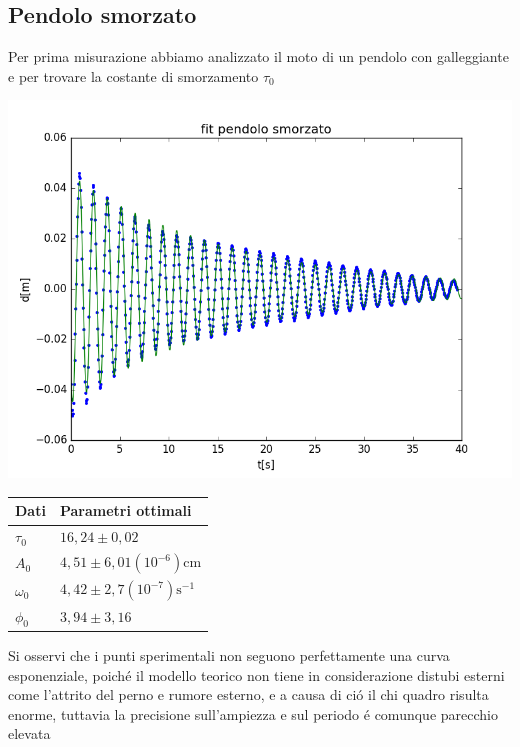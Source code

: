 \documentclass{exam}
\begin{document}
		\subsection{Pendolo smorzato}
			Per prima misurazione abbiamo analizzato il moto di un pendolo con galleggiante	e per trovare la costante di smorzamento $\tau_{0}$ \\
			\begin{minipage}{0.5\textwidth}
				\includegraphics[width=\textwidth]{fit_smorzato}
				\end{minipage}
			\begin{minipage}{0.5\textwidth}
				\begin{tabular}{ll}
					\toprule
					Dati & Parametri ottimali \\
					\midrule
					$\tau_{0}$ & $16,24 \pm 0,02$ \\
					$A_{0}$ & $4,51 \pm 6,01(10^{-6})$cm\\
					$\omega_{0}$ & $4,42 \pm 2,7(10^{-7})\textrm{s}^{-1}$\\			
					$\phi_{0}$ & $3,94 \pm 3,16$\\
					\bottomrule

				\end{tabular}
			\end{minipage}
			Si osservi che i punti sperimentali non seguono perfettamente una curva esponenziale, poich\'e il modello teorico non tiene in considerazione distubi esterni come l'attrito del perno e rumore esterno, e a causa di ci\'o il chi quadro risulta enorme, tuttavia la precisione sull'ampiezza e sul periodo \'e comunque parecchio elevata
\end{document}
